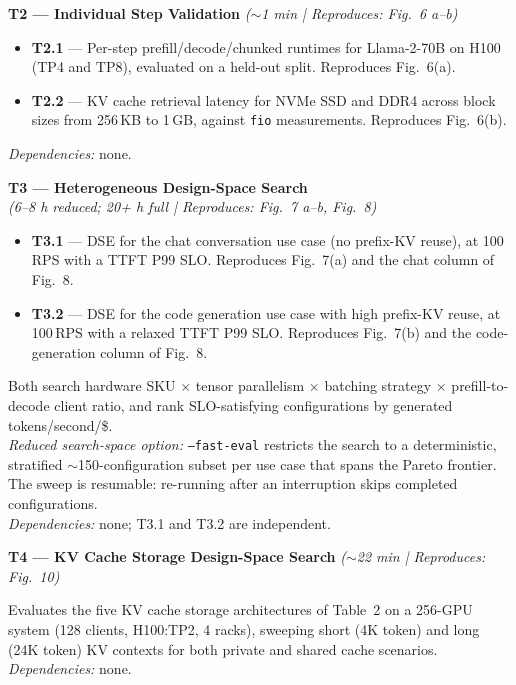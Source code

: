 \documentclass[conference]{IEEEtran}
\begin{document}
\noindent\textbf{T2 --- Individual Step Validation}
\hfill\textit{($\sim$1 min | Reproduces: Fig.~6 a--b)}

\begin{itemize}[leftmargin=1.2em, topsep=2pt]
  \item \textbf{T2.1} --- Per-step prefill/decode/chunked runtimes for
        Llama-2-70B on H100 (TP4 and TP8), evaluated on a held-out
        split.  Reproduces Fig.~6(a).
  \item \textbf{T2.2} --- KV cache retrieval latency for NVMe SSD and
        DDR4 across block sizes from 256\,KB to 1\,GB, against
        \texttt{fio} measurements.  Reproduces Fig.~6(b).
\end{itemize}
\textit{Dependencies:} none.
\smallskip

\noindent\textbf{T3 --- Heterogeneous Design-Space Search}\\
\textit{(6--8 h reduced; 20+ h full | Reproduces: Fig.~7 a--b, Fig.~8)}

\begin{itemize}[leftmargin=1.2em, topsep=2pt]
  \item \textbf{T3.1} --- DSE for the chat conversation use case
        (no prefix-KV reuse), at 100\,RPS with a TTFT P99 SLO.
        Reproduces Fig.~7(a) and the chat column of Fig.~8.
  \item \textbf{T3.2} --- DSE for the code generation use case with high
        prefix-KV reuse, at 100\,RPS with a relaxed TTFT P99 SLO.
        Reproduces Fig.~7(b) and the code-generation column of Fig.~8.
\end{itemize}
Both search hardware SKU $\times$ tensor parallelism $\times$ batching
strategy $\times$ prefill-to-decode client ratio, and rank
SLO-satisfying configurations by generated tokens/second/\$.\\
\textit{Reduced search-space option:} \texttt{--fast-eval} restricts the
search to a deterministic, stratified $\sim$150-configuration subset per
use case that spans the Pareto frontier.  The sweep is resumable:
re-running after an interruption skips completed configurations.\\
\textit{Dependencies:} none; T3.1 and T3.2 are independent.
\smallskip

\noindent\textbf{T4 --- KV Cache Storage Design-Space Search}
\hfill\textit{($\sim$22 min | Reproduces: Fig.~10)}

Evaluates the five KV cache storage architectures of Table~2 on a
256-GPU system (128 clients, H100:TP2, 4 racks), sweeping short (4K
token) and long (24K token) KV contexts for both private and shared
cache scenarios.\\
\textit{Dependencies:} none.
\end{document}
